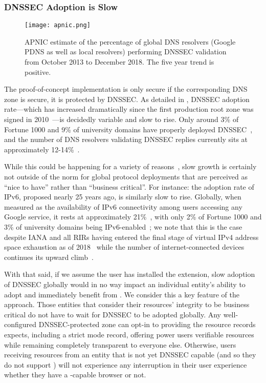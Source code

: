 \subsubsection{DNSSEC Adoption is Slow}

\begin{figure*}[t]
    \centering
    \texttt{[image: apnic.png]}
    \caption{APNIC estimate of the percentage of global DNS resolvers (Google
    PDNS as well as local resolvers) performing DNSSEC validation from October
    2013 to December 2018. The five year trend is positive.}\label{fig:apnic}
\end{figure*}

The proof-of-concept \DNSSYS{} implementation is only secure if the
corresponding DNS zone is secure, \ie it is protected by DNSSEC. As detailed in
, DNSSEC adoption rate---which has increased dramatically since
the first production root zone was signed in 2010~\cite{Cloudflare, APNIC}---is
decidedly variable and slow to rise. Only around 3\% of Fortune 1000 and 9\% of
university domains have properly deployed DNSSEC~\cite{NIST-IPv6}, and the
number of DNS resolvers validating DNSSEC replies currently sits at
approximately 12-14\%~\cite{APNIC}.

While this could be happening for a variety of reasons~\cite{DNSSEC-is-hard-1,
DNSSEC-is-hard-2, DNSSEC-is-hard-3, DNSSEC-is-hard-4, DNSSEC-is-hard-5}, slow
growth is certainly not outside of the norm for global protocol deployments that
are perceived as ``nice to have'' rather than ``business critical''. For
instance: the adoption rate of IPv6, proposed nearly 25 years ago, is similarly
slow to rise. Globally, when measured as the availability of IPv6 connectivity
among users accessing any Google service, it rests at approximately
21\%~\cite{Google-IPv6}, with only 2\% of Fortune 1000 and 3\% of university
domains being IPv6-enabled~\cite{NIST-IPv6}; we note that this is the case
despite IANA and all RIRs having entered the final stage of virtual IPv4
address space exhaustion as of 2018~\cite{APNIC-exhaustion} while the number of
internet-connected devices continues its upward climb~\cite{Cisco}.

With that said, if we assume the user has installed the \DNSSYS{} extension,
slow adoption of DNSSEC globally would in no way impact an individual entity's
ability to adopt and immediately benefit from \DNSSYS{}. We consider this a key
feature of the approach. Those entities that consider their resources' integrity
to be business critical do not have to wait for DNSSEC to be adopted globally.
Any well-configured DNSSEC-protected zone can opt-in to providing the resource
records \DNSSYS{} expects, including a strict mode record, offering power users
verifiable resources while remaining completely transparent to everyone else.
Otherwise, users receiving resources from an entity that is not yet DNSSEC
capable (and so they do not support \DNSSYS{}) will not experience any
interruption in their user experience whether they have a \DNSSYS{}-capable
browser or not.

